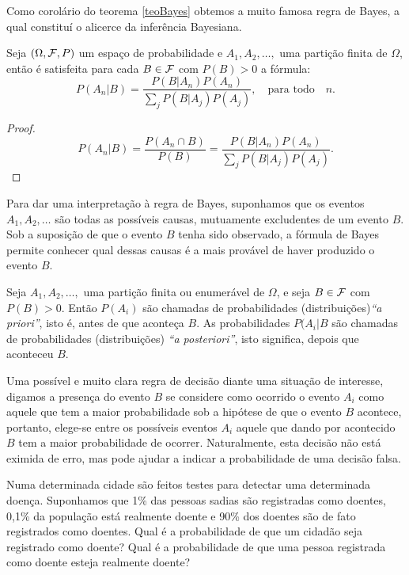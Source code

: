 \begin{frame}
Como corolário do teorema \ref{teoBayes} obtemos a muito famosa regra de Bayes, a qual constituí o alicerce da inferência Bayesiana. 

\begin{corol} Seja $(\Omega ,{\cal F}, P)$ um espaço de probabilidade e $A_{1},A_{2},\ldots,$ uma partição 
	finita de $\Omega$, então  é satisfeita para cada
	$B\in {\cal F}$  com $P(B)>0$ a fórmula:
	$$
	P(A_{n}|B)=\frac{P(B|A_{n})P(A_{n})}{\sum_{j}P(B|A_{j})P(A_j)}, \quad \text{para todo} \quad  n.
	$$
\end{corol}

 \begin{proof}
	$$P(A_{n}|B)=\frac{P(A_{n}\cap B)}{P(B)}=
	\frac{P(B|A_{n})P(A_{n})}{\sum_{j}P(B|A_{j})P(A_{j})}.$$
\end{proof}
Para dar uma interpretação à regra de Bayes, suponhamos que os eventos $A_1, A_2, \ldots $ são todas as possíveis causas, mutuamente excludentes de um evento $B.$ Sob a suposição de que o evento $B$ tenha sido observado, a fórmula de Bayes permite conhecer qual dessas causas é a mais provável de haver produzido o evento $B.$

\end{frame}




\begin{frame}
\begin{defi}
	Seja $A_{1},A_{2},\ldots ,$ uma partição finita ou enumerável de $\Omega $, e seja $B \in {\cal F}$ com $P(B)>0$. Então 
	$P(A_{i})$ são chamadas  de probabilidades (distribuições)\textit{``a priori''}, isto é, antes de que aconteça $B.$ As probabilidades $P(A_{i}|B$ são chamadas de probabilidades (distribuições)
	\textit{``a posteriori''}, isto significa, depois que aconteceu $B.$
\end{defi}

Uma possível e muito clara regra de decisão diante uma situação de interesse, digamos a presença do evento $B$ se considere como ocorrido o evento $A_i$ como aquele que tem a maior probabilidade sob a hipótese de que o evento $B$ acontece, portanto, elege-se entre os possíveis eventos $A_i$ aquele que dando por acontecido $B$ tem a maior probabilidade de ocorrer. Naturalmente, esta decisão não está eximida de erro, mas pode ajudar a indicar a probabilidade de uma decisão falsa.

\begin{exem}
	Numa determinada cidade são feitos testes para detectar uma determinada doença. Suponhamos que  1\% das pessoas sadias são registradas como doentes,  0,1\% da população está realmente doente e  90\% dos doentes são de fato registrados como doentes. Qual é a probabilidade de que um cidadão seja registrado como doente? Qual é a probabilidade de que uma pessoa registrada como doente esteja  realmente doente?  
\end{exem}

\end{frame}

